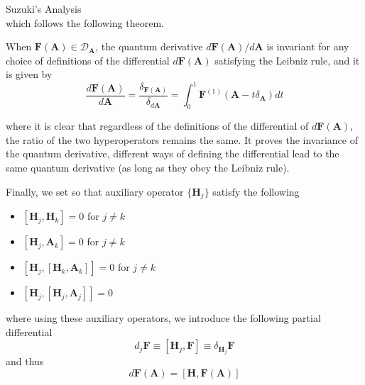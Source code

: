 \documentclass[aspectratio=169]{beamer}
\begin{document}
\begin{frame}[allowframebreaks]{Suzuki's Analysis}
\begin{equation}
		\end{equation}
		which follows the following theorem.
		\begin{theorem}
			When $\textbf{F}(\textbf{A})\in\mathcal{D}_{\textbf{A}}$, the quantum derivative $d\textbf{F}(\textbf{A})/d\textbf{A}$ is invariant for any choice of definitions of the diﬀerential $d\textbf{F}(\textbf{A})$ satisfying the Leibniz rule, and it is given by
			\begin{equation}
				\frac{d\textbf{F}(\textbf{A})}{d\textbf{A}}=\frac{\delta_{\textbf{F}(\textbf{A})}}{\delta_{d\textbf{A}}}=\int_0^1\textbf{F}^{(1)}(\textbf{A}-t\delta_{\textbf{A}})dt
			\end{equation}
		\end{theorem}
		where it is clear that regardless of the definitions of the differential of $d\textbf{F}(\textbf{A})$, the ratio of the two hyperoperators remains the same. It proves the invariance of the quantum derivative, different ways of defining the differential lead to the same quantum derivative (as long as they obey the Leibniz rule).
		
		Finally, we set so that auxiliary operator $\{\textbf{H}_j\}$ satisfy the following
		\begin{itemize}
			\item $[\textbf{H}_j,\textbf{H}_k]=0$ for $j\neq k$
			\item $[\textbf{H}_j,\textbf{A}_k]=0$ for $j\neq k$
			\item $[\textbf{H}_j,[\textbf{H}_k,\textbf{A}_k]]=0$ for $j\neq k$
			\item $[\textbf{H}_j,[\textbf{H}_j,\textbf{A}_j]]=0$
		\end{itemize}
		where using these auxiliary operators, we introduce the following partial differential
		\begin{equation}
			d_j\textbf{F}\equiv[\textbf{H}_j,\textbf{F}]\equiv\delta_{\textbf{H}_j}\textbf{F}
		\end{equation}
		and thus
		\begin{equation}
			d\textbf{F}(\textbf{A})=[\textbf{H},\textbf{F}(\textbf{A})]
		\end{equation}
	\end{frame}
	
\end{document}
